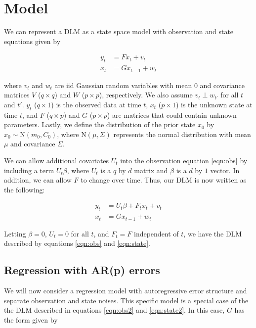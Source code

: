 \documentclass{article}
\begin{document}
\section{Model} \label{sec:model}

We can represent a DLM as a state space model with observation and state equations given by

\begin{align}
y_t &= Fx_t + v_t \label{eqn:obs} \\
x_t &= Gx_{t-1} + w_t \label{eqn:state}
\end{align}

\noindent where $v_t$ and $w_t$ are iid Gaussian random variables with mean 0 and covariance matrices $V$ ($q \times q$) and $W$ ($p \times p$), respectively. We also assume $v_t \perp w_{t'}$ for all $t$ and $t'$. $y_t$ ($q \times 1$) is the observed data at time $t$, $x_t$ ($p \times 1$) is the unknown state at time $t$, and $F$ ($q \times p$) and $G$ ($p \times p$) are matrices that could contain unknown parameters. Lastly, we define the distribution of the prior state $x_0$ by $x_0 \sim \mbox{N}(m_0, C_0)$, where $\mbox{N}(\mu, \Sigma)$ represents the normal distribution with mean $\mu$ and covariance $\Sigma$.

We can allow additional covariates $U_t$ into the observation equation \eqref{eqn:obs} by including a term $U_t \beta$, where $U_t$ is a $q$ by $d$ matrix and $\beta$ is a $d$ by $1$ vector. In addition, we can allow $F$ to change over time. Thus, our DLM is now written as the following:

\begin{align}
y_t &= U_t\beta + F_tx_t + v_t \label{eqn:obs2} \\
x_t &= Gx_{t-1} + w_t \label{eqn:state2}
\end{align}

\noindent Letting $\beta = 0$, $U_t = 0$ for all $t$, and $F_t = F$ independent of $t$, we have the DLM described by equations \eqref{eqn:obs} and \eqref{eqn:state}.

\subsection{Regression with AR(p) errors} \label{sec:reg}

We will now consider a regression model with autoregressive error structure and separate observation and state noises. This specific model is a special case of the the DLM described in equations \eqref{eqn:obs2} and \eqref{eqn:state2}. In this case, $G$ has the form given by
\end{document}

